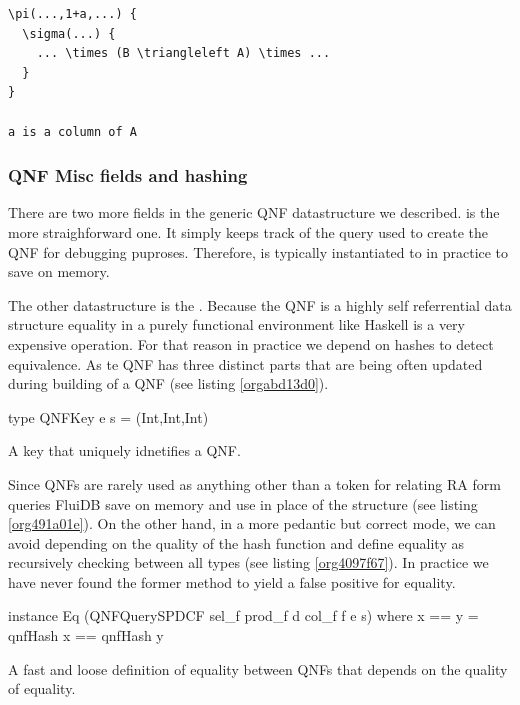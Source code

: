 \begin{verbatim}
\pi(...,1+a,...) {
  \sigma(...) {
    ... \times (B \triangleleft A) \times ...
  }
}

a is a column of A
\end{verbatim}


\subsubsection{QNF Misc fields and hashing}
\label{sec:org74a3a45}
There are two more fields in the generic QNF datastructure we
described.  is the more
straighforward one. It simply keeps track of the query used to create
the QNF for debugging puproses. Therefore,  is typically
instantiated to  in practice to save on memory.

The other datastructure is the . Because the QNF is
a highly self referrential data structure equality in a purely
functional environment like Haskell is a very expensive operation. For
that reason in practice we depend on hashes to detect equivalence. As
te QNF has three distinct parts that are being often updated during
building of a QNF (see listing \ref{orgabd13d0}).

\begin{code}
  \begin{haskellcode}
    type QNFKey e s = (Int,Int,Int)
  \end{haskellcode}
  \caption{\label{orgabd13d0}A key that uniquely idnetifies a QNF.}
\end{code}

Since QNFs are rarely used as anything other than a token for relating
RA form queries FluiDB save on memory and use  in place of the
 structure (see listing \ref{org491a01e}). On the other hand,
in a more pedantic but correct mode, we can avoid depending on the
quality of the hash function and define equality as recursively
checking between all types (see listing \ref{org4097f67}). In
practice we have never found the former method to yield a false
positive for equality.

\begin{code}
  \begin{haskellcode}
    instance Eq (QNFQuerySPDCF sel_f prod_f d col_f f e s) where
    x == y = qnfHash x == qnfHash y
  \end{haskellcode}
  \caption{\label{org491a01e}A fast and loose definition of equality between QNFs that depends on the quality of equality.}
\end{code}

